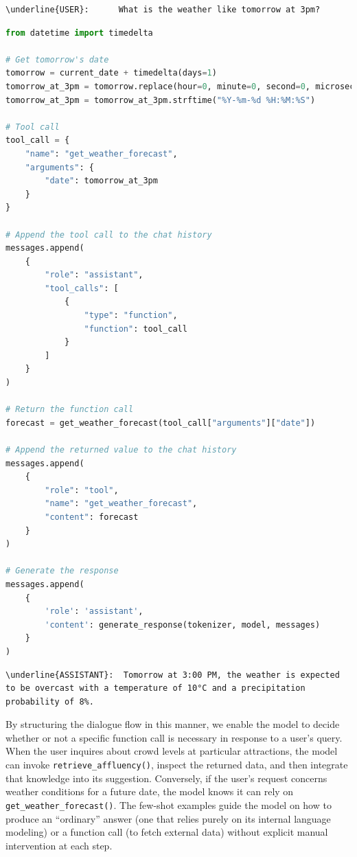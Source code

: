 \begin{enumerate}
\begin{Verbatim}[breaklines=true]
\underline{USER}:      What is the weather like tomorrow at 3pm?
\end{Verbatim}
\begin{center}
\begin{lstlisting}[language=Python, frame=single, caption=Few-shot on \texttt{get\_weather\_forecast()}.]
from datetime import timedelta

# Get tomorrow's date
tomorrow = current_date + timedelta(days=1)
tomorrow_at_3pm = tomorrow.replace(hour=0, minute=0, second=0, microsecond=0)
tomorrow_at_3pm = tomorrow_at_3pm.strftime("%Y-%m-%d %H:%M:%S")

# Tool call
tool_call = {
    "name": "get_weather_forecast",
    "arguments": {
        "date": tomorrow_at_3pm
    }
}

# Append the tool call to the chat history
messages.append(
    {
        "role": "assistant",
        "tool_calls": [
            {
                "type": "function",
                "function": tool_call
            }
        ]
    }
)

# Return the function call
forecast = get_weather_forecast(tool_call["arguments"]["date"])

# Append the returned value to the chat history
messages.append(
    {
        "role": "tool",
        "name": "get_weather_forecast",
        "content": forecast
    }
)

# Generate the response
messages.append(
    {
        'role': 'assistant',
        'content': generate_response(tokenizer, model, messages)
    }
)
\end{lstlisting}
\label{lst:few-shot-weather}
\end{center}
\begin{Verbatim}[breaklines=true]
\underline{ASSISTANT}:  Tomorrow at 3:00 PM, the weather is expected to be overcast with a temperature of 10°C and a precipitation probability of 8%.
\end{Verbatim}
\end{enumerate}

By structuring the dialogue flow in this manner, we enable the model to decide whether or not a specific function call is necessary in response to a user’s query. When the user inquires about crowd levels at particular attractions, the model can invoke \texttt{retrieve\_affluency()}, inspect the returned data, and then integrate that knowledge into its suggestion. Conversely, if the user’s request concerns weather conditions for a future date, the model knows it can rely on \texttt{get\_weather\_forecast()}. The few-shot examples guide the model on how to produce an “ordinary” answer (one that relies purely on its internal language modeling) or a function call (to fetch external data) without explicit manual intervention at each step. 

